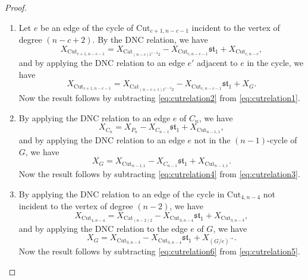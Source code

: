 \documentclass[12pt]{amsart}  %
\theoremstyle{definition}
\theoremstyle{remark}
\numberwithin{equation}{section}
\begin{document}
\begin{proof}\hspace{0pt}
\begin{enumerate}
\item Let $e$ be an edge of the cycle of $\text{Cut}_{c+1,n-c-1}$ incident to the vertex of degree $(n-c+2)$. By the DNC relation, we have
\begin{equation}\label{eq:cutrelation1}
X_{\text{Cut}_{c+1,n-c-1}}=X_{\text{Cat}_{(n-c)1^{c-2}2}}-X_{\text{Cut}_{c,n-c-1}}\mathfrak{st}_1+X_{\text{Cut}_{c,n-c}},
\end{equation}
and by applying the DNC relation to an edge $e'$ adjacent to $e$ in the cycle, we have
\begin{equation}\label{eq:cutrelation2}
X_{\text{Cut}_{c+1,n-c-1}}=X_{\text{Cat}_{(n-c+1)1^{c-3}2}}-X_{\text{Cut}_{c,n-c-1}}\mathfrak{st}_1+X_G.
\end{equation}
Now the result follows by subtracting \eqref{eq:cutrelation2} from \eqref{eq:cutrelation1}.
\item By applying the DNC relation to an edge $e$ of $C_n$, we have
\begin{equation}\label{eq:cutrelation3}
X_{C_n}=X_{P_n}-X_{C_{n-1}}\mathfrak{st}_1+X_{\text{Cut}_{n-1,1}},
\end{equation}
and by applying the DNC relation to an edge $e$ not in the $(n-1)$-cycle of $G$, we have
\begin{equation}\label{eq:cutrelation4}
X_G=X_{\text{Cut}_{n-1,1}}-X_{C_{n-1}}\mathfrak{st}_1+X_{\text{Cut}_{n-1,1}}.
\end{equation}
Now the result follows by subtracting \eqref{eq:cutrelation4} from \eqref{eq:cutrelation3}.
\item By applying the DNC relation to an edge of the cycle in $\text{Cut}_{4,n-4}$ not incident to the vertex of degree $(n-2)$, we have
\begin{equation}\label{eq:cutrelation5}
X_{\text{Cut}_{4,n-4}}=X_{\text{Cat}_{(n-2)2}}-X_{\text{Cut}_{3,n-4}}\mathfrak{st}_1+X_{\text{Cut}_{3,n-3}},
\end{equation}
and by applying the DNC relation to the edge $e$ of $G$, we have
\begin{equation}\label{eq:cutrelation6}
X_G=X_{\text{Cut}_{3,n-3}}-X_{\text{Cut}_{3,n-4}}\mathfrak{st}_1+X_{(G/e)^\multimap}.
\end{equation}
Now the result follows by subtracting \eqref{eq:cutrelation6} from \eqref{eq:cutrelation5}.
\end{enumerate}
\end{proof}
\end{document}
